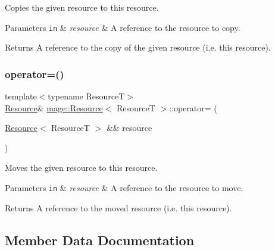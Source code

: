 Copies the given resource to this resource.


\begin{DoxyParams}[1]{Parameters}
\mbox{\tt in}  & {\em resource} & A reference to the resource to copy. \\
\hline
\end{DoxyParams}
\begin{DoxyReturn}{Returns}
A reference to the copy of the given resource (i.\+e. this resource). 
\end{DoxyReturn}
\hypertarget{classmage_1_1_resource_aff0080e944136b1b0e889d4dd6cfb11f}{}\label{classmage_1_1_resource_aff0080e944136b1b0e889d4dd6cfb11f} 
\subsubsection{\texorpdfstring{operator=()}{operator=()}\hspace{0.1cm}{\footnotesize\ttfamily [2/2]}}
{\footnotesize\ttfamily template$<$typename ResourceT$>$ \\
\hyperlink{classmage_1_1_resource}{Resource}\& \hyperlink{classmage_1_1_resource}{mage\+::\+Resource}$<$ ResourceT $>$\+::operator= (\begin{DoxyParamCaption}\item[{\hyperlink{classmage_1_1_resource}{Resource}$<$ ResourceT $>$ \&\&}]{resource }\end{DoxyParamCaption})\hspace{0.3cm}{\ttfamily [delete]}}

Moves the given resource to this resource.


\begin{DoxyParams}[1]{Parameters}
\mbox{\tt in}  & {\em resource} & A reference to the resource to move. \\
\hline
\end{DoxyParams}
\begin{DoxyReturn}{Returns}
A reference to the moved resource (i.\+e. this resource). 
\end{DoxyReturn}


\subsection{Member Data Documentation}
\hypertarget{classmage_1_1_resource_a52738047e1da0c3abaad4ea1e3d6a972}{}\label{classmage_1_1_resource_a52738047e1da0c3abaad4ea1e3d6a972} 

